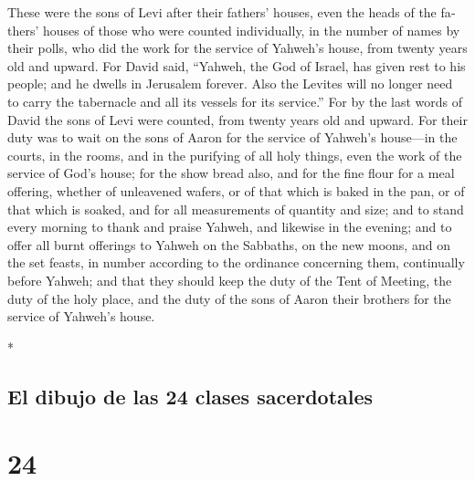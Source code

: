 \begin{paracol}{2}
\begin{otherlanguage}{english}
 These were the sons of Levi after their fathers' houses,
even the heads of the fathers' houses of those who were counted
individually, in the number of names by their polls, who did the work
for the service of Yahweh's house, from twenty years old and upward.
 For David said, ``Yahweh, the God of Israel, has given
rest to his people; and he dwells in Jerusalem forever. 
Also the Levites will no longer need to carry the tabernacle and all its
vessels for its service.''  For by the last words of
David the sons of Levi were counted, from twenty years old and upward.
 For their duty was to wait on the sons of Aaron for the
service of Yahweh's house---in the courts, in the rooms, and in the
purifying of all holy things, even the work of the service of God's
house;  for the show bread also, and for the fine flour
for a meal offering, whether of unleavened wafers, or of that which is
baked in the pan, or of that which is soaked, and for all measurements
of quantity and size;  and to stand every morning to
thank and praise Yahweh, and likewise in the evening; 
and to offer all burnt offerings to Yahweh on the Sabbaths, on the new
moons, and on the set feasts, in number according to the ordinance
concerning them, continually before Yahweh;  and that
they should keep the duty of the Tent of Meeting, the duty of the holy
place, and the duty of the sons of Aaron their brothers for the service
of Yahweh's house.

\end{otherlanguage}

\switchcolumn[0]*

\hypertarget{el-dibujo-de-las-24-clases-sacerdotales}{%
\subsection{El dibujo de las 24 clases
sacerdotales}\label{el-dibujo-de-las-24-clases-sacerdotales}}

\hypertarget{section-46}{%
\section{24}\label{section-46}}


\end{paracol}
